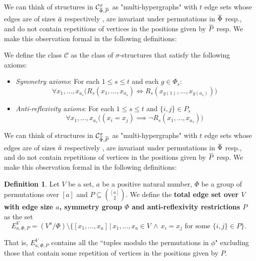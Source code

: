 \documentclass[12pt,notitlepage,a4paper]{article}
\theoremstyle{definition}
\newtheorem{definition}{Definition}[section]
\newcommand{\overbar}[1]{\mkern 1.5mu\overline{\mkern-1.5mu#1\mkern-1.5mu}\mkern 1.5mu}
\begin{document}
We can think of structures in  $\mathcal{C}^{\sigma}_{\overbar{\Phi},\overbar{P}}$
as "multi-hypergraphs" with
$t$ edge sets whose edges are of sizes $\overbar{a}$ respectively
, are invariant under permutations in $\overbar{\Phi}$ resp., 
and do 
not contain repetitions of vertices in the positions given by
$\overbar{P}$ resp. We make this observation formal in the 
following definitions:



We define the class $\mathcal{C}$ as the 
class of $\sigma$-structures that
satisfy the 
following axioms: 
\begin{itemize}
	\item \textit{Symmetry axioms}: For each $1\leq s \leq t$ and
	each $g\in \Phi_s$:
	\[ \forall x_1,\dots, x_{a_s} \big(  R_s(x_1,\dots, x_{a_s})
	\iff R_s(x_{g(1)},\dots,x_{g(a_s)}) \big)    \]
	\item \textit{Anti-reflexivity axioms}: For each 
	$1\leq s \leq t$ and $\{i,j\}\in P_s$
	\[ \forall x_1,\dots, x_{a_s} 
	\big( (x_i=x_j) \implies \neg R_s(x_1,\dots, x_{a_s})
	\big)\]
	\end{itemize}

We can think of structures in  $\mathcal{C}^{\sigma}_{\overbar{\Phi},\overbar{P}}$
as "multi-hypergraphs" with
$t$ edge sets whose edges are of sizes $\overbar{a}$ respectively
, are invariant under permutations in $\overbar{\Phi}$ resp., 
and do 
not contain repetitions of vertices in the positions given by
$\overbar{P}$ resp. We make this observation formal in the 
following definitions:

\begin{definition} 
	Let $V$ be a set, $a$ be a positive natural number,
	$\Phi$ be a group of permutations over $[a]$ and
	$P\subseteq \binom{[a]}{2}$. 
	We define the \textbf{total
	edge set over $V$ with edge size $a$, symmetry group $\Phi$ and 
	anti-reflexivity restrictions $P$} as the set
	\[ E^{V}_{a,\Phi,P}= (V^a/\Phi) \setminus \{ [x_1,\dots,x_a]  
	\,| \,
	x_1,\dots,x_a\in V \, \wedge \, x_i=x_j \text{ for some } \{i,j\}\in P \}. \]
\end{definition}

That is, $E^{V}_{a,\Phi,P}$ contains all the ``tuples modulo the permutations
in $\phi$" excluding those that contain some repetition of vertices in
the positions given by $P$.
\end{document}
